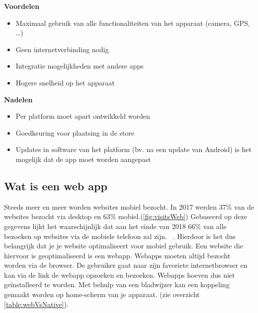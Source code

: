\begin{minipage}[t]{0.5\textwidth}
	\textbf{Voordelen}
	\begin{itemize}  
		\item Maximaal gebruik van alle functionaliteiten van het apparaat (camera, GPS, \dots)
		\item Geen internetverbinding nodig
		\item Integratie mogelijkheden met andere apps
		\item Hogere snelheid op het apparaat
	\end{itemize}
\end{minipage}
\begin{minipage}[t]{0.5\textwidth}
		\textbf{Nadelen}
	\begin{itemize}  
		\item Per platform moet apart ontwikkeld worden
		\item Goedkeuring voor plaatsing in de store
		\item Updates in software van het platform (bv. na een update van Android) is het mogelijk dat de app moet worden aangepast
\end{itemize}
\end{minipage}


\subsection{Wat is een web app}
Steeds meer en meer worden websites mobiel bezocht. In 2017 werden 37\% van de websites bezocht via desktop en 63\% mobiel.(\ref{fig:visitsWeb}) Gebaseerd op deze gegevens lijkt het waarschijnlijk dat aan het einde van 2018 66\% van alle bezoeken op websites via de mobiele telefoon zal zijn. ~\autocite{traffic}. Hierdoor is het dus belangrijk dat je je website optimaliseert voor mobiel gebruik. Een website die hiervoor is geoptimaliseerd is een webapp. Webapps moeten altijd bezocht worden via de browser. De gebruiker gaat naar zijn favoriete internetbrowser en kan via de link de webapp opzoeken en bezoeken. Webapps hoeven dus niet geïnstalleerd te worden. Met behulp van een bladwijzer kan een koppeling gemaakt worden op home-scherm van je apparaat. (zie overzicht \ref{table:webVsNative}).


